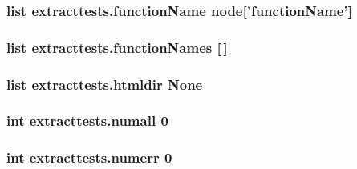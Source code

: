 \hypertarget{namespaceextracttests_ac1d22207f0c1a71d7f9a8e9359fae974}{
\subsubsection[{function\-Name}]{\setlength{\rightskip}{0pt plus 5cm}list extracttests.\-function\-Name node\mbox{[}'function\-Name'\mbox{]}}}\label{namespaceextracttests_ac1d22207f0c1a71d7f9a8e9359fae974}
\hypertarget{namespaceextracttests_a66c49796ea762e04dadfd4e147d65a9e}{
\subsubsection[{function\-Names}]{\setlength{\rightskip}{0pt plus 5cm}list extracttests.\-function\-Names \mbox{[}$\,$\mbox{]}}}\label{namespaceextracttests_a66c49796ea762e04dadfd4e147d65a9e}
\hypertarget{namespaceextracttests_a4802ed7c6c7398fd5bc6700a06be8056}{
\subsubsection[{htmldir}]{\setlength{\rightskip}{0pt plus 5cm}list extracttests.\-htmldir None}}\label{namespaceextracttests_a4802ed7c6c7398fd5bc6700a06be8056}
\hypertarget{namespaceextracttests_ab50c99b16c07a041ebc7b644ba08958d}{
\subsubsection[{numall}]{\setlength{\rightskip}{0pt plus 5cm}int extracttests.\-numall 0}}\label{namespaceextracttests_ab50c99b16c07a041ebc7b644ba08958d}
\hypertarget{namespaceextracttests_aadecd15e2b96e102a700da2f7e282aab}{
\subsubsection[{numerr}]{\setlength{\rightskip}{0pt plus 5cm}int extracttests.\-numerr 0}}\label{namespaceextracttests_aadecd15e2b96e102a700da2f7e282aab}
